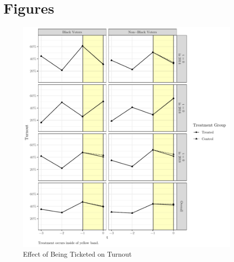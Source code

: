 \documentclass[
  12pt,
]{article}
\begin{document}
\begin{singlespace}

\end{singlespace}

\begin{singlespace}

\end{singlespace}

\hypertarget{figures}{%
\section*{Figures}\label{figures}}

\begin{figure}[H]

{\centering \includegraphics{not_blind_files/figure-latex/did1-1} 

}

\caption{\label{fig:did-1}Effect of Being Ticketed on Turnout}\label{fig:did1}
\end{figure}
\end{document}
